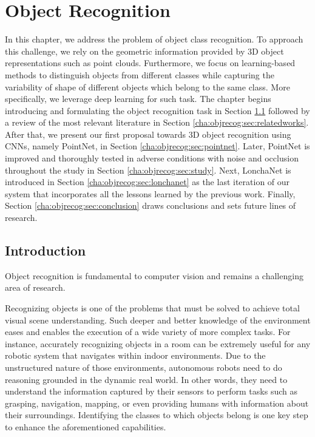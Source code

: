 \chapter{Object Recognition}
\label{cha:objrecog}

\begin{chapterabstract}
In this chapter, we address the problem of object class recognition. To approach this challenge, we rely on the geometric information provided by 3D object representations such as point clouds. Furthermore, we focus on learning-based methods to distinguish objects from different classes while capturing the variability of shape of different objects which belong to the same class. More specifically, we leverage deep learning for such task. The chapter begins introducing and formulating the object recognition task in Section \ref{cha:objrecog:sec:introduction} followed by a review of the most relevant literature in Section \ref{cha:objrecog:sec:relatedworks}. After that, we present our first proposal towards 3D object recognition using \acp{CNN}, namely PointNet, in Section \ref{cha:objrecog:sec:pointnet}. Later, PointNet is improved and thoroughly tested in adverse conditions with noise and occlusion throughout the study in Section \ref{cha:objrecog:sec:study}. Next, LonchaNet is introduced in Section \ref{cha:objrecog:sec:lonchanet} as the last iteration of our system that incorporates all the lessons learned by the previous work. Finally, Section \ref{cha:objrecog:sec:conclusion} draws conclusions and sets future lines of research.
\end{chapterabstract}

\section{Introduction}
\label{cha:objrecog:sec:introduction}

Object recognition is fundamental to computer vision and remains a challenging area of research. 

Recognizing objects is one of the problems that must be solved to achieve total visual scene understanding. Such deeper and better knowledge of the environment eases and enables the execution of a wide variety of more complex tasks. For instance, accurately recognizing objects in a room can be extremely useful for any robotic system that navigates within indoor environments. Due to the unstructured nature of those environments, autonomous robots need to do reasoning grounded in the dynamic real world. In other words, they need to understand the information captured by their sensors to perform tasks such as grasping, navigation, mapping, or even providing humans with information about their surroundings. Identifying the classes to which objects belong is one key step to enhance the aforementioned capabilities.

